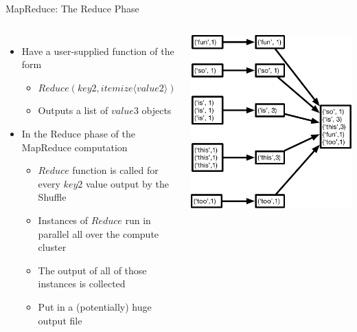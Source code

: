 \documentclass[aspectratio=169]{beamer}
\begin{document}
\begin{frame}{MapReduce: The Reduce Phase}

\begin{columns}[c]
\begin{itemize}
\item Have a user-supplied function of the form
        \begin{itemize}
        \item $Reduce (key2, itemize \langle value2 \rangle)$
	\item Outputs a list of $value3$ objects
        \end{itemize}
\item In the Reduce phase of the MapReduce computation
        \begin{itemize}
        \item $Reduce$ function is called for every $key2$ value output by the Shuffle
        \item Instances of $Reduce$ run in parallel all over the compute cluster
	\item The output of all of those instances is collected
	\item Put in a (potentially) huge output file
        \end{itemize}
\end{itemize}
    	{\includegraphics[width=1\textwidth]{./lectBigData/reduce.pdf}} \\
\end{columns}
\end{frame}
\end{document}
